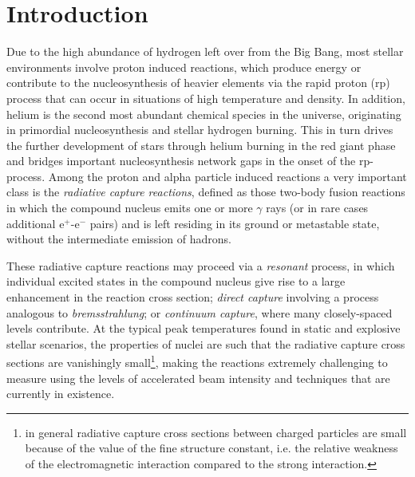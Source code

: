 \section{Introduction}
\label{intro}

Due to the high abundance of hydrogen left over from the Big Bang, most stellar environments involve proton induced reactions, which produce energy or contribute to the nucleosynthesis of heavier elements via the rapid proton (rp) process that can occur in situations of high temperature and density. In addition, helium is the second most abundant chemical species in the universe, originating in primordial nucleosynthesis and stellar hydrogen burning. This in turn drives the further development of stars through helium burning in the red giant phase and bridges important nucleosynthesis network gaps in the onset of the rp-process. Among the proton and alpha particle induced reactions a very important class is the {\em radiative capture reactions}, defined as those two-body fusion reactions in which the compound nucleus emits one or more $\gamma$ rays (or in rare cases additional e$^{+}$-e$^{-}$ pairs) and is left residing in its ground or metastable state, without the intermediate emission of hadrons. 

These radiative capture reactions may proceed via a {\em resonant} process, in which individual excited states in the compound nucleus give rise to a large enhancement in the reaction cross section; {\em direct capture} involving a process analogous to {\em bremsstrahlung}; or {\em continuum capture}, where many closely-spaced levels contribute. At the typical peak temperatures found in static and explosive stellar scenarios, the properties of nuclei are such that the radiative capture cross sections are vanishingly small\footnote{in general radiative capture cross sections between charged particles are small because of the value of the fine structure constant, i.e. the relative weakness of the electromagnetic interaction compared to the strong interaction.}, making the reactions extremely challenging to measure using the levels of accelerated beam intensity and techniques that are currently in existence. 

